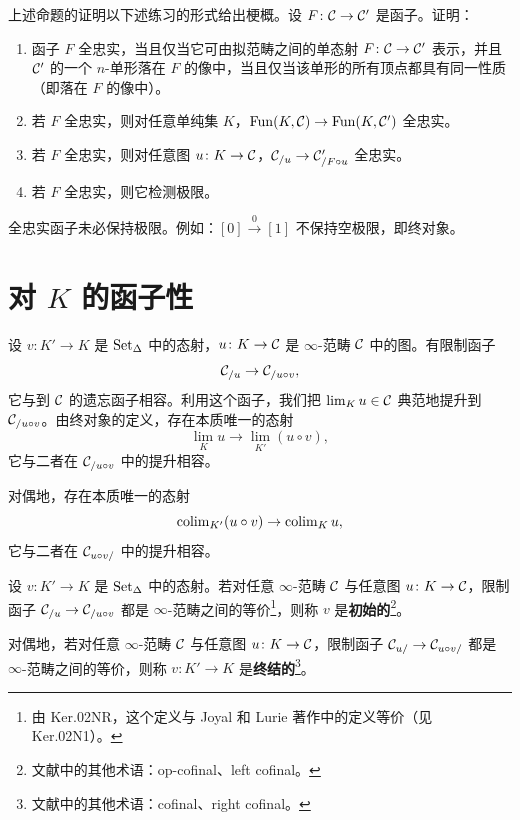 \begin{exercise}\label{L7-2.17}
上述命题的证明以下述练习的形式给出梗概。设 $F\colon\mathcal{C}\to\mathcal{C}'$ 是函子。证明：
\begin{enumerate}[label=(\arabic*),leftmargin=2.4em,itemsep=0.1em]
\item 函子 $F$ 全忠实，当且仅当它可由拟范畴之间的单态射 $F\colon\mathcal{C}\to\mathcal{C}'$ 表示，并且 $\mathcal{C}'$ 的一个 $n$-单形落在 $F$ 的像中，当且仅当该单形的所有顶点都具有同一性质（即落在 $F$ 的像中）。
\item 若 $F$ 全忠实，则对任意单纯集 $K$，$\operatorname{Fun}(K,\mathcal{C})\to\operatorname{Fun}(K,\mathcal{C}')$ 全忠实。
\item 若 $F$ 全忠实，则对任意图 $u\colon K\to\mathcal{C}$，$\mathcal{C}_{/u}\to\mathcal{C}'_{/F\circ u}$ 全忠实。
\item 若 $F$ 全忠实，则它检测极限。
\end{enumerate}
\end{exercise}

\begin{warning}\label{L7-2.18}
全忠实函子未必保持极限。例如：$[0]\xrightarrow{0}[1]$ 不保持空极限，即终对象。
\end{warning}

\section{对 $K$ 的函子性}

\begin{construction}\label{L7-3.1}
设 $v\colon K'\to K$ 是 $\operatorname{Set}_\Delta$ 中的态射，$u\colon K\to\mathcal{C}$ 是 $\infty$-范畴 $\mathcal{C}$ 中的图。有限制函子
\[
\mathcal{C}_{/u}\to\mathcal{C}_{/u\circ v},
\]
它与到 $\mathcal{C}$ 的遗忘函子相容。利用这个函子，我们把 $\lim_K u\in\mathcal{C}$ 典范地提升到 $\mathcal{C}_{/u\circ v}$。由终对象的定义，存在本质唯一的态射
\[
\lim_K u\to\lim_{K'}(u\circ v),
\]
它与二者在 $\mathcal{C}_{/u\circ v}$ 中的提升相容。

对偶地，存在本质唯一的态射
\[
\operatorname{colim}_{K'}(u\circ v)\to\operatorname{colim}_K u,
\]
它与二者在 $\mathcal{C}_{u\circ v/}$ 中的提升相容。
\end{construction}

\begin{definition}\label{L7-3.2}
设 $v\colon K'\to K$ 是 $\operatorname{Set}_\Delta$ 中的态射。若对任意 $\infty$-范畴 $\mathcal{C}$ 与任意图 $u\colon K\to\mathcal{C}$，限制函子 $\mathcal{C}_{/u}\to\mathcal{C}_{/u\circ v}$ 都是 $\infty$-范畴之间的等价\footnote{由 Ker.02NR，这个定义与 Joyal 和 Lurie 著作中的定义等价（见 Ker.02N1）。}，则称 $v$ 是\textbf{初始的}\footnote{文献中的其他术语：op-cofinal、left cofinal。}。

对偶地，若对任意 $\infty$-范畴 $\mathcal{C}$ 与任意图 $u\colon K\to\mathcal{C}$，限制函子 $\mathcal{C}_{u/}\to\mathcal{C}_{u\circ v/}$ 都是 $\infty$-范畴之间的等价，则称 $v\colon K'\to K$ 是\textbf{终结的}\footnote{文献中的其他术语：cofinal、right cofinal。}。
\end{definition}


